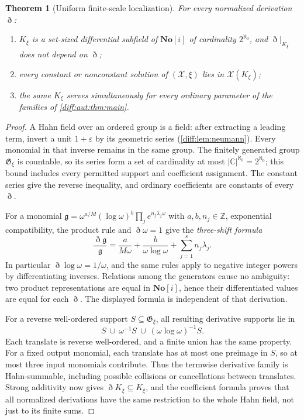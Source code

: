 \documentclass[11pt,letterpaper]{article}
\numberwithin{equation}{section}
\newtheorem{theorem}{Theorem}[section]
\theoremstyle{definition}
\theoremstyle{remark}
\newcommand{\SC}{\mathbf{No}[i]}
\newcommand{\C}{\mathbb C}
\newcommand{\Z}{\mathbb Z}
\newcommand{\Dn}{\eth}
\begin{document}
\begin{theorem}[Uniform finite-scale localization]
\label{diff:aut:thm:scales}
For every normalized derivation $\Dn$:
\begin{enumerate}[label=\textup{(\roman*)},leftmargin=2.4em]
\item $K_{\xi}$ is a set-sized differential subfield of $\SC$ of cardinality
$2^{\aleph_{0}}$, and $\Dn|_{K_{\xi}}$ does not depend on $\Dn$;
\item every constant or nonconstant solution of $(\mathcal X,\xi)$ lies in
$\mathcal X(K_{\xi})$;
\item the same $K_{\xi}$ serves simultaneously for every ordinary parameter of
the families of \cref{diff:aut:thm:main}.
\end{enumerate}
\end{theorem}
\begin{proof}
A Hahn field over an ordered group is a field: after extracting a leading term,
invert a unit $1+\varepsilon$ by its geometric series
(\cref{diff:lem:neumann}). Every monomial in that inverse remains in the
same group. The finitely generated group $\mathfrak G_\xi$ is countable,
so its series form a set of cardinality at most
$|\C|^{\aleph_0}=2^{\aleph_0}$; this bound includes every permitted
support and coefficient assignment. The constant series give the reverse
inequality, and ordinary coefficients are constants of every $\Dn$.

For a monomial
$\mathfrak g=\omega^{a/M}(\log\omega)^b\prod_j e^{n_j\lambda_j\omega}$
with $a,b,n_j\in\Z$, exponential compatibility, the product rule and
$\Dn\omega=1$ give the \emph{three-shift formula}
\begin{equation}\label{diff:aut:eq:threeshift}
 \frac{\Dn\mathfrak g}{\mathfrak g}=\frac{a}{M\omega}+\frac{b}{\omega\log\omega}
 +\sum_{j=1}^{s}n_{j}\lambda_{j}.
\end{equation}
In particular $\Dn\log\omega=1/\omega$, and the same rules apply to
negative integer powers by differentiating inverses. Relations among the
generators cause no ambiguity: two product representations are equal in
$\SC$, hence their differentiated values are equal for each $\Dn$.
The displayed formula is independent of that derivation.

For a reverse well-ordered support $S\subseteq\mathfrak G_\xi$, all
resulting derivative supports lie in
\[
 S\ \cup\ \omega^{-1}S\ \cup\ (\omega\log\omega)^{-1}S.
\]
Each translate is reverse well-ordered, and a finite union has the same
property. For a fixed output monomial, each translate has at most one
preimage in $S$, so at most three input monomials contribute. Thus the
termwise derivative family is Hahn-summable, including possible collisions
or cancellations between translates. Strong additivity now gives
$\Dn K_\xi\subseteq K_\xi$, and the coefficient formula proves that
all normalized derivations have the same restriction to the whole Hahn
field, not just to its finite sums.


\end{proof}
\end{document}
